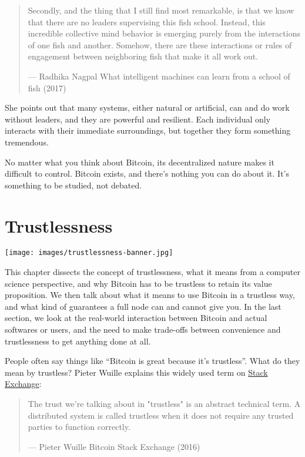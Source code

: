 \begin{quote}
Secondly, and the thing that I still find most remarkable, is that we
know that there are no leaders supervising this fish school. Instead,
this incredible collective mind behavior is emerging purely from the
interactions of one fish and another. Somehow, there are these
interactions or rules of engagement between neighboring fish that make
it all work out.

---  Radhika Nagpal What intelligent machines can learn from a school of
fish (2017)
\end{quote}

She points out that many systems, either natural or artificial, can and
do work without leaders, and they are powerful and resilient. Each
individual only interacts with their immediate surroundings, but
together they form something tremendous.

No matter what you think about Bitcoin, its decentralized nature makes
it difficult to control. Bitcoin exists, and there's nothing you can do
about it. It's something to be studied, not debated.

\hypertarget{trustlessness}{%
\section{Trustlessness}\label{trustlessness}}

\texttt{[image: images/trustlessness-banner.jpg]}

This chapter dissects the concept of trustlessness, what it means from a
computer science perspective, and why Bitcoin has to be trustless to
retain its value proposition. We then talk about what it means to use
Bitcoin in a trustless way, and what kind of guarantees a full node can
and cannot give you. In the last section, we look at the real-world
interaction between Bitcoin and actual softwares or users, and the need
to make trade-offs between convenience and trustlessness to get anything
done at all.

People often say things like ``Bitcoin is great because it's
trustless''. What do they mean by trustless? Pieter Wuille explains this
widely used term on
\href{https://bitcoin.stackexchange.com/a/45674/69518}{Stack Exchange}:

\begin{quote}
The trust we're talking about in "trustless" is an abstract technical
term. A distributed system is called trustless when it does not require
any trusted parties to function correctly.

---  Pieter Wuille Bitcoin Stack Exchange (2016)
\end{quote}

